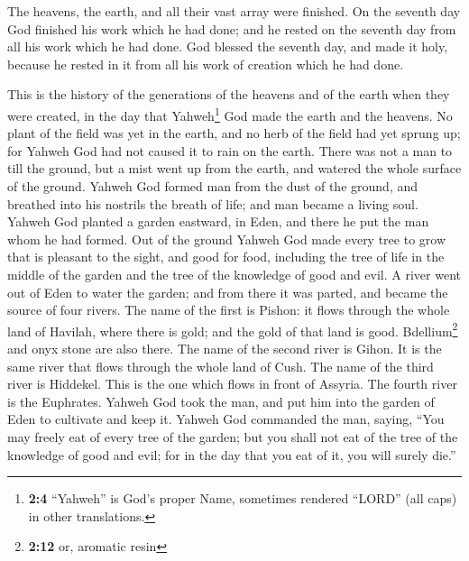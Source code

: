  The heavens, the earth, and all their vast array were
finished.  On the seventh day God finished his work which
he had done; and he rested on the seventh day from all his work which he
had done.  God blessed the seventh day, and made it holy,
because he rested in it from all his work of creation which he had done.

 This is the history of the generations of the heavens and
of the earth when they were created, in the day that Yahweh\footnote{\textbf{2:4}
  ``Yahweh'' is God's proper Name, sometimes rendered ``LORD'' (all
  caps) in other translations.} God made the earth and the heavens.
 No plant of the field was yet in the earth, and no herb
of the field had yet sprung up; for Yahweh God had not caused it to rain
on the earth. There was not a man to till the ground,  but
a mist went up from the earth, and watered the whole surface of the
ground.  Yahweh God formed man from the dust of the
ground, and breathed into his nostrils the breath of life; and man
became a living soul.  Yahweh God planted a garden
eastward, in Eden, and there he put the man whom he had formed.
 Out of the ground Yahweh God made every tree to grow that
is pleasant to the sight, and good for food, including the tree of life
in the middle of the garden and the tree of the knowledge of good and
evil.  A river went out of Eden to water the garden; and
from there it was parted, and became the source of four rivers.
 The name of the first is Pishon: it flows through the
whole land of Havilah, where there is gold;  and the gold
of that land is good. Bdellium\footnote{\textbf{2:12} or, aromatic resin}
and onyx stone are also there.  The name of the second
river is Gihon. It is the same river that flows through the whole land
of Cush.  The name of the third river is Hiddekel. This
is the one which flows in front of Assyria. The fourth river is the
Euphrates.  Yahweh God took the man, and put him into the
garden of Eden to cultivate and keep it.  Yahweh God
commanded the man, saying, ``You may freely eat of every tree of the
garden;  but you shall not eat of the tree of the
knowledge of good and evil; for in the day that you eat of it, you will
surely die.''

